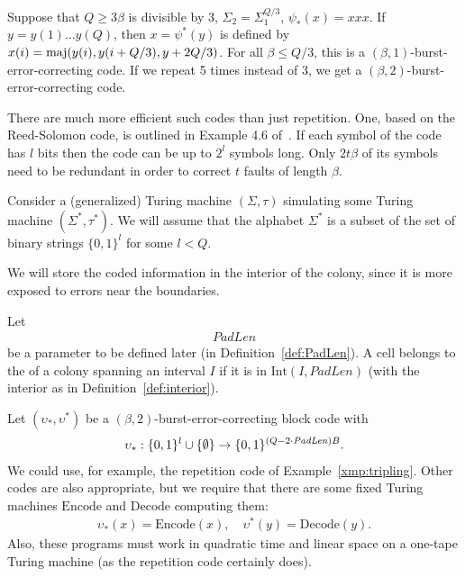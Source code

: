 \documentclass[11pt]{memoir}
\theoremstyle{definition} %
\renewcommand{\le}{\leq}
\renewcommand{\ge}{\geq}
\def\B{B}
\newcommand{\F}{F}
\newcommand{\Int}{\mathrm{Int}} %
\newcommand{\Q}{Q} %
\newcommand{\Decode}{\mathrm{Decode}}
\newcommand{\Encode}{\mathrm{Encode}}
\newcommand{\PadLen}{\mathit{PadLen}} %
\begin{document}
\begin{example}\label{xmp:tripling}
  Suppose that \( \Q\ge 3\beta \) is divisible by 3,
  \( \Sigma_{2}=\Sigma_{1}^{\Q/3} \), \( \psi_{*}(x)=xxx \).
  If \( y=y(1)\dots y(\Q) \), then \( x=\psi^{*}(y) \) is defined by
    \( x(i)=\maj(y(i),y(i+\Q/3),y+2\Q/3) \).
    For all \( \beta\le \Q/3 \), this is a
    \( (\beta,1) \)-burst-error-correcting code.
    If we repeat 5 times instead of 3, we get a \( (\beta,2) \)-burst-error-correcting
    code.
  \end{example}

  \begin{example}\label{xmp:Reed-Solomon}
    There are much more efficient such codes than just repetition.
    One, based on the Reed-Solomon code, is outlined in Example 4.6
    of~\cite{GacsSorg01}.
    If each symbol of the code has \( l \) bits then the code can be up to \( 2^{l} \) symbols long.
    Only \( 2 t\beta \) of its symbols need to be redundant in order
    to correct \( t \) faults of length \( \beta \).
  \end{example}

Consider a (generalized) Turing machine 
\( (\Sigma,\tau) \) simulating some Turing machine \( (\Sigma^{*},\tau^{*}) \).
We will assume that the alphabet \( \Sigma^{*} \) is a subset of the set of  binary strings
\( \{0,1\}^{l} \) for some \( l<\Q \).

We will store the coded information in the interior of the colony, since it is more exposed 
to errors near the boundaries.

\begin{definition}\label{def:colony-interior}
Let 
\begin{align*}
  \PadLen 
\end{align*}
be a parameter to be defined later (in Definition~\ref{def:PadLen}).
A cell belongs to the  of a colony spanning an interval \( I \)
if it is in \( \Int(I,\PadLen) \) (with the interior as in Definition~\ref{def:interior}).
\end{definition}

Let \( (\upsilon_{*}, \upsilon^{*}) \) be a \( (\beta,2) \)-burst-error-correcting block code
with
\begin{align*}
  \upsilon_{*}: \{0,1\}^{l} \cup \set{\emptyset}
   \to\{0,1\}^{(\Q-2\cdot\PadLen)\B}.
\end{align*}
We could use, for example, the repetition code of Example~\ref{xmp:tripling}.
Other codes are also appropriate, but we require that there are some fixed Turing machines
\( \Encode \) and \( \Decode \) computing them:
 \begin{align*}
   \upsilon_{*}(x)=\Encode(x),\quad 
   \upsilon^{*}(y)=\Decode( y).
 \end{align*}
Also, these programs must work in quadratic time and linear space on a one-tape
Turing machine (as the repetition code certainly does).
\end{document}
